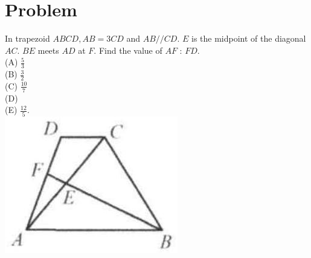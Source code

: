 \documentclass{article}
\begin{document}
\section*{Problem}
In trapezoid \(A B C D, A B=3 C D\) and \(A B / / C D\). \(E\) is the midpoint of the diagonal \(A C\). \(B E\) meets \(A D\) at \(F\). Find the value of \(A F\) : \(F D\).\\
(A) \(\frac{5}{3}\)\\
(B) \(\frac{3}{2}\)\\
(C) \(\frac{10}{7}\)\\
(D)\\
(E) \(\frac{12}{5}\).\\
\centering
\includegraphics[width=\textwidth]{images/128.jpg}
\end{document}

